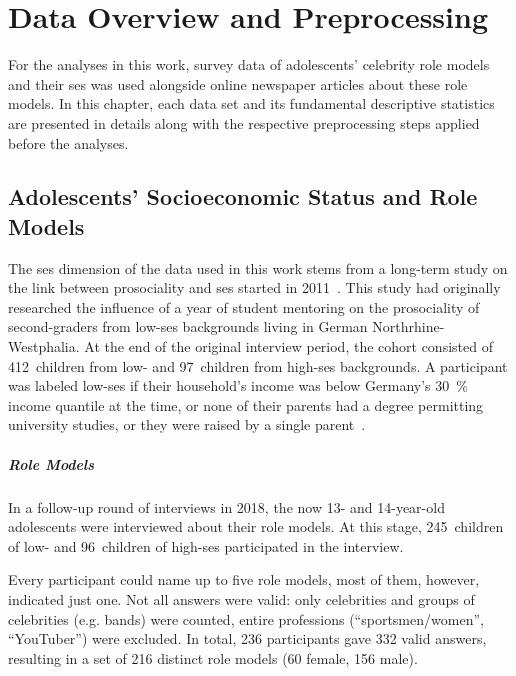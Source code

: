 \renewcommand{\imagepath}{../30-data/img}

\chapter{Data Overview and Preprocessing}\label{ch:data}
For the analyses in this work, survey data of adolescents' celebrity role models and their \gls{ses} was used alongside online newspaper articles about these role models. In this chapter, each data set and its fundamental descriptive statistics are presented in details along with the respective preprocessing steps applied before the analyses.

\section{Adolescents' Socioeconomic Status and Role Models}
The \gls{ses} dimension of the data used in this work stems from a long-term study on the link between prosociality and \gls{ses} started in 2011~\autocite{kosse_formation_2020}. This study had originally researched the influence of a year of student mentoring on the prosociality of second-graders from low-\gls{ses} backgrounds living in German Northrhine-Westphalia. At the end of the original interview period, the cohort consisted of \SI{412}{children} from low- and \SI{97}{children} from high-\gls{ses} backgrounds. A participant was labeled low-\gls{ses} if their household's income was below Germany's \SI{30}{\percent} income quantile at the time, or none of their parents had a degree permitting university studies, or they were raised by a single parent~\autocite{kosse_formation_2020}.

\paragraph{Role Models}
In a follow-up round of interviews in 2018, the now 13- and 14-year-old adolescents were interviewed about their role models. At this stage, \SI{245}{children} of low- and \SI{96}{children} of high-\gls{ses} participated in the interview.

Every participant could name up to five role models, most of them, however, indicated just one. Not all answers were valid: only celebrities and groups of celebrities (e.g. bands) were counted, entire professions (``sportsmen/women'', ``YouTuber'') were excluded. In total, \SI{236}{} participants gave \SI{332}{} valid answers, resulting in a set of \SI{216}{} distinct role models (\SI{60}{} female, \SI{156}{} male).

